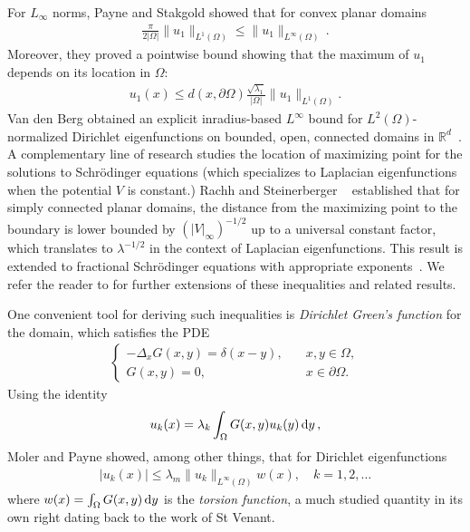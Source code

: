 \documentclass{amsart}
\theoremstyle{plain}
\begin{document}
For $L_\infty$ norms, Payne and Stakgold showed that for convex planar domains~\cite{payne1973mean}
  \begin{align}
    \frac{\pi}{2|\Omega|}\|u_1\|_{L^1(\Omega)} \le \|u_1\|_{L^\infty(\Omega)} \,.
  \end{align}
Moreover, they proved a pointwise bound showing that the maximum of $u_1$ depends on its location in $\Omega$:
  \begin{align}
    u_1(x)\le d(x,\partial\Omega) \frac{\sqrt{\lambda_1}}{|\Omega|}\|u_1\|_{L^1(\Omega)}.
  \end{align}
Van den Berg obtained an explicit inradius-based $L^\infty$ bound for $L^2(\Omega)$-normalized Dirichlet eigenfunctions on bounded, open, connected domains in $\mathbb{R}^d$~\cite{van2000norm}.
A complementary line of research studies the location of maximizing point for the solutions to Schr\"{o}dinger equations (which specializes to Laplacian eigenfunctions when the potential $V$ is constant.)
Rachh and Steinerberger ~\cite{rachh2018location} established that for simply connected planar domains, the distance from the maximizing point to the boundary is lower bounded by $(|V|_\infty)^{-1/2}$ up to a universal constant factor, which translates to $\lambda^{-1/2}$ in the context of Laplacian eigenfunctions.
This result is extended to fractional Schr\"{o}dinger equations with appropriate exponents~\cite{biswas2017location}.
We refer the reader to \cite{grebenkov2013geometrical} for further extensions of these inequalities and related results.

One convenient tool for deriving such inequalities is {\it Dirichlet Green's function} for the domain, which satisfies the PDE
\begin{align}
\label{eq:dirichlet_greenfun}
\begin{cases}
-\Delta_x G(x,y) = \delta(x-y),\quad &x,y\in \Omega,\\
G(x,y) = 0, \quad &x \in \partial \Omega.
\end{cases}    
\end{align}
Using the identity
\begin{align}
  u_k(x) = \lambda_k \int_\Omega G(x,y) u_k(y)\,{\rm d}y \,,
\end{align}
Moler and Payne \cite{moler1968bounds} showed, among other things, that for Dirichlet eigenfunctions
\begin{align}
  |u_k(x)|\le \lambda_m\|u_k\|_{L^\infty(\Omega)}w(x),  \quad k=1,2,\dots
\end{align}
where $w(x) = \int_\Omega G(x,y)\,{\rm d}y$ is the {\it torsion function}, a much studied quantity in its own right dating back to the work of St Venant.
\end{document}
